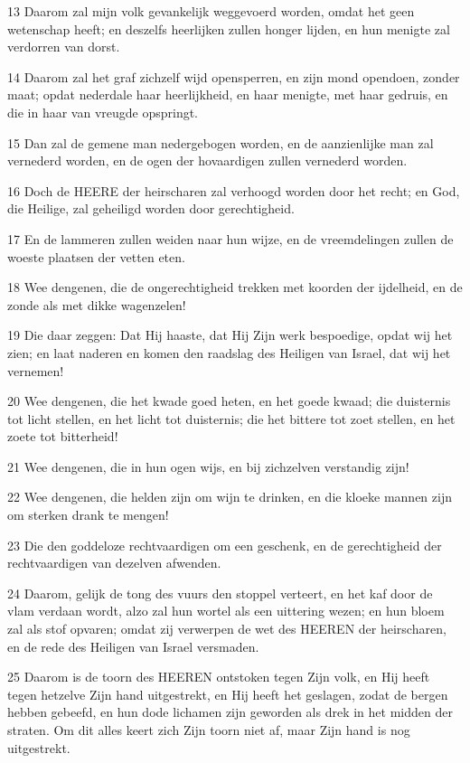 \par 13 Daarom zal mijn volk gevankelijk weggevoerd worden, omdat het geen wetenschap heeft; en deszelfs heerlijken zullen honger lijden, en hun menigte zal verdorren van dorst.
\par 14 Daarom zal het graf zichzelf wijd opensperren, en zijn mond opendoen, zonder maat; opdat nederdale haar heerlijkheid, en haar menigte, met haar gedruis, en die in haar van vreugde opspringt.
\par 15 Dan zal de gemene man nedergebogen worden, en de aanzienlijke man zal vernederd worden, en de ogen der hovaardigen zullen vernederd worden.
\par 16 Doch de HEERE der heirscharen zal verhoogd worden door het recht; en God, die Heilige, zal geheiligd worden door gerechtigheid.
\par 17 En de lammeren zullen weiden naar hun wijze, en de vreemdelingen zullen de woeste plaatsen der vetten eten.
\par 18 Wee dengenen, die de ongerechtigheid trekken met koorden der ijdelheid, en de zonde als met dikke wagenzelen!
\par 19 Die daar zeggen: Dat Hij haaste, dat Hij Zijn werk bespoedige, opdat wij het zien; en laat naderen en komen den raadslag des Heiligen van Israel, dat wij het vernemen!
\par 20 Wee dengenen, die het kwade goed heten, en het goede kwaad; die duisternis tot licht stellen, en het licht tot duisternis; die het bittere tot zoet stellen, en het zoete tot bitterheid!
\par 21 Wee dengenen, die in hun ogen wijs, en bij zichzelven verstandig zijn!
\par 22 Wee dengenen, die helden zijn om wijn te drinken, en die kloeke mannen zijn om sterken drank te mengen!
\par 23 Die den goddeloze rechtvaardigen om een geschenk, en de gerechtigheid der rechtvaardigen van dezelven afwenden.
\par 24 Daarom, gelijk de tong des vuurs den stoppel verteert, en het kaf door de vlam verdaan wordt, alzo zal hun wortel als een uittering wezen; en hun bloem zal als stof opvaren; omdat zij verwerpen de wet des HEEREN der heirscharen, en de rede des Heiligen van Israel versmaden.
\par 25 Daarom is de toorn des HEEREN ontstoken tegen Zijn volk, en Hij heeft tegen hetzelve Zijn hand uitgestrekt, en Hij heeft het geslagen, zodat de bergen hebben gebeefd, en hun dode lichamen zijn geworden als drek in het midden der straten. Om dit alles keert zich Zijn toorn niet af, maar Zijn hand is nog uitgestrekt.
